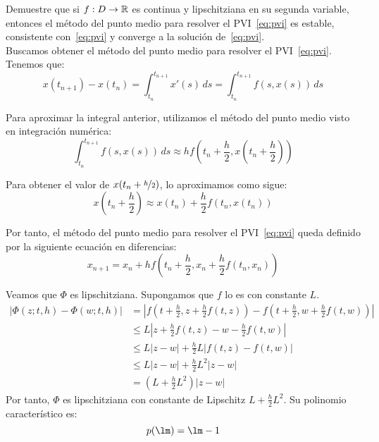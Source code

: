 \begin{ejercicio}\label{ej:3.1.3}
    Demuestre que si $f : D \to \mathbb{R}$ es continua y lipschitziana en su segunda variable, entonces el método del punto medio para resolver el PVI~\eqref{eq:pvi} es estable, consistente con~\eqref{eq:pvi} y converge a la solución de~\eqref{eq:pvi}.\\

    Buscamos obtener el método del punto medio para resolver el PVI~\eqref{eq:pvi}. Tenemos que:
    \begin{equation*}
        x(t_{n+1})-x(t_n) = \int_{t_n}^{t_{n+1}} x'(s)\, ds = \int_{t_n}^{t_{n+1}} f(s, x(s))\, ds
    \end{equation*}

    Para aproximar la integral anterior, utilizamos el método del punto medio visto en integración numérica:
    \begin{equation*}
        \int_{t_n}^{t_{n+1}} f(s, x(s))\, ds \approx h f\left(t_n + \frac{h}{2}, x\left(t_n + \frac{h}{2}\right)\right)
    \end{equation*}

    Para obtener el valor de $x(t_n + \nicefrac{h}{2})$, lo aproximamos como sigue:
    \begin{equation*}
        x\left(t_n + \frac{h}{2}\right) \approx x(t_n) + \frac{h}{2} f(t_n, x(t_n))
    \end{equation*}

    Por tanto, el método del punto medio para resolver el PVI~\eqref{eq:pvi} queda definido por la siguiente ecuación en diferencias:
    \begin{equation*}
        x_{n+1} = x_n + h f\left(t_n + \frac{h}{2}, x_n + \frac{h}{2} f(t_n, x_n)\right)
    \end{equation*}

    Veamos que $\Phi$ es lipschitziana. Supongamos que $f$ lo es con constante $L$.
    \begin{align*}
        |\Phi(z; t, h) - \Phi(w; t, h)| &= \left| f\left(t + \frac{h}{2}, z + \frac{h}{2} f(t, z)\right) - f\left(t + \frac{h}{2}, w + \frac{h}{2} f(t, w)\right) \right|\\
        &\leq L\left|z + \frac{h}{2} f(t, z) - w - \frac{h}{2} f(t, w)\right|\\
        &\leq L\left|z - w\right| + \frac{h}{2} L \left|f(t, z) - f(t, w)\right|\\
        &\leq L\left|z - w\right| + \frac{h}{2} L^2 \left|z - w\right|\\
        &= \left(L + \frac{h}{2} L^2\right) \left|z - w\right|
    \end{align*}
    Por tanto, $\Phi$ es lipschitziana con constante de Lipschitz $L + \frac{h}{2} L^2$.
    Su polinomio característico es:
    \begin{equation*}
        p(\lm) = \lm -1
    \end{equation*}


\end{ejercicio}
